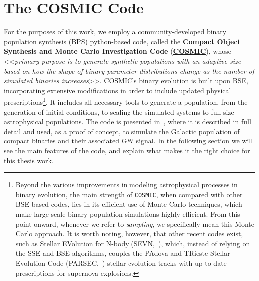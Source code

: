 \section{{The COSMIC Code}}
For the purposes of this work, we employ a community-developed binary population synthesis (BPS) python-based code, called the \textbf{Compact Object Synthesis and Monte Carlo Investigation Code} (\underline{\textbf{\href{https://cosmic-popsynth.github.io/docs/stable/pages/about.html}{COSMIC}}}), whose <<\textit{primary purpose is to generate synthetic populations with an adaptive size based on how the shape of binary parameter distributions change as the number of simulated binaries increases}>>. 
COSMIC's binary evolution is built upon BSE, incorporating extensive modifications in order to include updated physical prescriptions\footnote{{Beyond the various improvements in modeling astrophysical processes in binary evolution, the main strength of \texttt{COSMIC}, when compared with other BSE-based codes, lies in its efficient use of Monte Carlo techniques, which make large-scale binary population simulations highly efficient.  
From this point onward, whenever we refer to \textit{sampling}, we specifically mean this Monte Carlo approach.  
It is worth noting, however, that other recent codes exist, such as Stellar EVolution for N-body (\underline{\href{https://ascl.net/2206.019}{SEVN}},~\cite{SEVN}), which, instead of relying on the SSE and BSE algorithms, couples the PAdova and TRieste Stellar Evolution Code (PARSEC,~\cite{PARSEC}) stellar evolution tracks with up-to-date prescriptions for supernova explosions.}  
}.
It  includes all necessary tools to generate a population, from the generation of initial conditions, to scaling the simulated systems to full-size astrophysical populations.
The code is presented in~\cite{Breivik}, where it is described in full detail and used, as a proof of concept, to simulate the Galactic population of compact binaries and their associated GW signal.
In the following section we will see the main features of the code, and explain what makes it the right choice for this thesis work.

